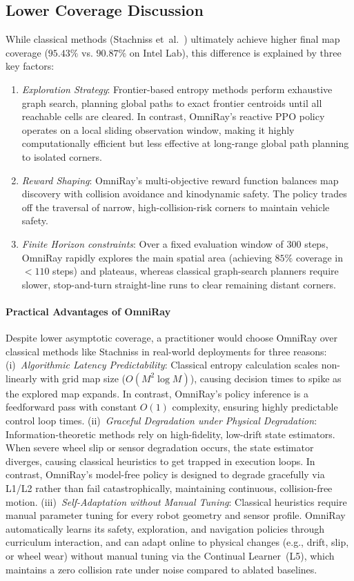 \documentclass[conference]{IEEEtran}
\begin{document}
\subsection{Lower Coverage Discussion}
While classical methods (Stachniss et~al.~\cite{stachniss2005}) ultimately achieve higher final map coverage ($95.43\%$ vs. $90.87\%$ on Intel Lab), this difference is explained by three key factors:
\begin{enumerate}
    \item \textit{Exploration Strategy}: Frontier-based entropy methods perform exhaustive graph search, planning global paths to exact frontier centroids until all reachable cells are cleared. In contrast, OmniRay's reactive PPO policy operates on a local sliding observation window, making it highly computationally efficient but less effective at long-range global path planning to isolated corners.
    \item \textit{Reward Shaping}: OmniRay's multi-objective reward function balances map discovery with collision avoidance and kinodynamic safety. The policy trades off the traversal of narrow, high-collision-risk corners to maintain vehicle safety.
    \item \textit{Finite Horizon constraints}: Over a fixed evaluation window of 300 steps, OmniRay rapidly explores the main spatial area (achieving $85\%$ coverage in $<110$ steps) and plateaus, whereas classical graph-search planners require slower, stop-and-turn straight-line runs to clear remaining distant corners.
\end{enumerate}

\paragraph{Practical Advantages of OmniRay}
Despite lower asymptotic coverage, a practitioner would choose OmniRay over classical methods like Stachniss in real-world deployments for three reasons:
(i)~\textit{Algorithmic Latency Predictability}: Classical entropy calculation scales non-linearly with grid map size ($O(M^2 \log M)$), causing decision times to spike as the explored map expands. In contrast, OmniRay's policy inference is a feedforward pass with constant $O(1)$ complexity, ensuring highly predictable control loop times.
(ii)~\textit{Graceful Degradation under Physical Degradation}: Information-theoretic methods rely on high-fidelity, low-drift state estimators. When severe wheel slip or sensor degradation occurs, the state estimator diverges, causing classical heuristics to get trapped in execution loops. In contrast, OmniRay's model-free policy is designed to degrade gracefully via L1/L2 rather than fail catastrophically, maintaining continuous, collision-free motion.
(iii)~\textit{Self-Adaptation without Manual Tuning}: Classical heuristics require manual parameter tuning for every robot geometry and sensor profile. OmniRay automatically learns its safety, exploration, and navigation policies through curriculum interaction, and can adapt online to physical changes (e.g., drift, slip, or wheel wear) without manual tuning via the Continual Learner~(L5), which maintains a zero collision rate under noise compared to ablated baselines.
\end{document}
